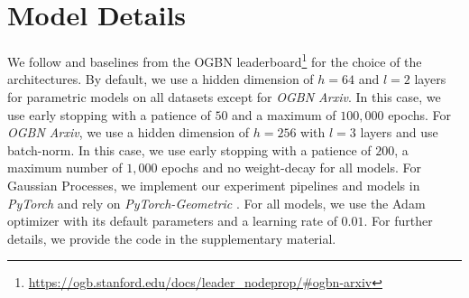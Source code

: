 

\section{Model Details} \label{sec:app_model_details}

We follow \citep{Shchur2018, Klicpera2019, Zhao2020} and baselines from the OGBN leaderboard\footnote{\url{https://ogb.stanford.edu/docs/leader_nodeprop/\#ogbn-arxiv}} for the choice of the architectures. By default, we use a hidden dimension of $h = 64$ and $l=2$ layers for parametric models on all datasets except for \emph{OGBN Arxiv}. In this case, we use early stopping with a patience of $50$ and a maximum of $100,000$ epochs. For \emph{OGBN Arxiv}, we use a hidden dimension of $h = 256$ with $l=3$ layers and use batch-norm. In this case, we use early stopping with a patience of $200$, a maximum number of $1,000$ epochs and no weight-decay for all models. For Gaussian Processes, we implement our experiment pipelines and models in \emph{PyTorch} \citep{pytorch} and rely on \emph{PyTorch-Geometric} \citep{pytorch-geometric}. For all models, we use the Adam optimizer \citep{Adam} with its default parameters and a learning rate of $0.01$. For further details, we provide the code in the supplementary material.

